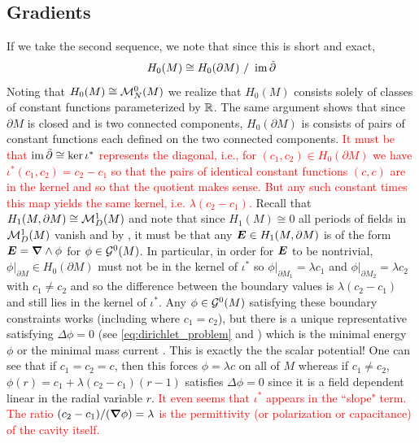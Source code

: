 \documentclass{article}
\begin{document}
\subsection{Gradients}
If we take the second sequence, we note that since this is short and exact,
\begin{equation}
    H_0(M) \cong H_0(\partial M) ~ / ~ \operatorname{im} \tilde{\partial}
\end{equation}
Noting that $H_0(M)\cong \mathcal{M}^0_N(M)$ we realize that $H_0(M)$ consists solely of classes of constant functions parameterized by $\mathbb{R}$. The same argument shows that since $\partial M$ is closed and is two connected components, $H_0(\partial M)$ is consists of pairs of constant functions each defined on the two connected components. \textcolor{red}{It must be that $\operatorname{im} \tilde{\partial}\cong \ker \iota^*$ represents the diagonal, i.e., for $(c_1,c_2)\in H_0(\partial M)$ we have $\iota^*(c_1,c_2) = c_2-c_1$ so that the pairs of identical constant functions $(c,c)$ are in the kernel and so that the quotient makes sense. But any such constant times this map yields the same kernel, i.e. $\lambda(c_2-c_1)$.} Recall that $H_1(M,\partial M)\cong \mathcal{M}^1_D(M)$ and note that since $H_1(M)\cong 0$ all periods of fields in $\mathcal{M}^1_D(M)$ vanish and by \cite[Theorem 6, pg. 598]{giaquinta_cartesian_1998-1}, it must be that any $\boldsymbol{E}\in H_1(M,\partial M)$ is of the form $\boldsymbol{E} = \boldsymbol{\nabla} \wedge \phi$ for $\phi \in \mathcal{G}^0(M)$. In particular, in order for $\boldsymbol{E}$ to be nontrivial, $\phi\vert_{\partial M} \in H_0(\partial M)$ must not be in the kernel of $\iota^*$ so $\phi\vert_{\partial M_1}=\lambda c_1$ and $\phi\vert_{\partial M_2}=\lambda c_2$ with $c_1 \neq c_2$ and so the difference between the boundary values is $\lambda(c_2-c_1)$ and still lies in the kernel of $\iota^*$. Any $\phi \in \mathcal{G}^0(M)$ satisfying these boundary constraints works (including where $c_1=c_2$), but there is a unique representative satisfying $\Delta \phi = 0$ (see \cref{eq:dirichlet_problem} and \cite[Theorem 3.4.6]{schwarz_hodge_1995}) which is the minimal energy $\phi$ or the minimal mass current . This is exactly the the scalar potential! One can see that if $c_1=c_2=c$, then this forces $\phi=\lambda c$ on all of $M$ whereas if $c_1\neq c_2$, $\phi(r)=c_1+\lambda (c_2-c_1)(r-1)$ satisfies $\Delta \phi = 0$ since it is a field dependent linear in the radial variable $r$. \textcolor{red}{It even seems that $\iota^*$ appears in the ``slope" term. The ratio $(c_2-c_1)/(\boldsymbol{\nabla} \phi) = \lambda$ is the permittivity (or polarization or capacitance) of the cavity itself.} 
\end{document}
